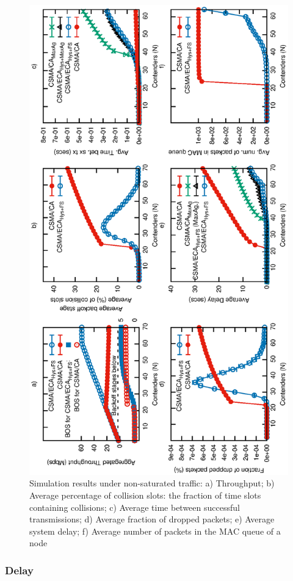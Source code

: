 	\begin{figure}[tb]
		\centering
		\includegraphics[width=0.5\linewidth,angle=-90]{figures/tonFigs/nonsaturation-combined.eps}
		\caption{Simulation results under non-saturated traffic: a) Throughput; b) Average percentage of collision slots: the fraction of time slots containing collisions; c) Average time between successful transmissions; d) Average fraction of dropped packets; e) Average system delay; f) Average number of packets in the MAC queue of a node}
		\label{fig:unsatResults}
	\end{figure}
		
	
	
	\subsubsection{Delay}
	
	

